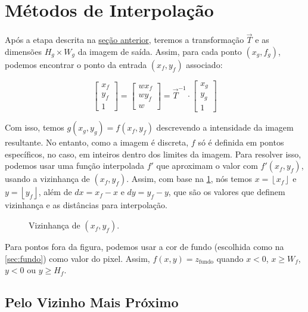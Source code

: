 \section{Métodos de Interpolação} \label{sec:interp}

Após a etapa descrita na \hyperref[sec:transformacoes]{seção anterior}, teremos a transformação $\vec{T}$ e as dimensões $H_g \times W_g$ da imagem de saída. Assim, para cada ponto $(x_g, f_g)$, podemos encontrar o ponto da entrada $(x_f, y_f)$ associado:

\[
    \begin{bmatrix}
        x_f \\
        y_f \\
        1
    \end{bmatrix}
    = \begin{bmatrix}
        w x_f \\
        w y_f \\
        w
    \end{bmatrix}
    = \vec{T}^{-1} \cdot \begin{bmatrix}
        x_g \\
        y_g \\
        1
    \end{bmatrix}
\]

Com isso, temos $g(x_g, y_g) = f(x_f, y_f)$ descrevendo a intensidade da imagem resultante. No entanto, como a imagem é discreta, $f$ só é definida em pontos específicos, no caso, em inteiros dentro dos limites da imagem. Para resolver isso, podemos usar uma função interpolada $f'$ que aproximam o valor com $f'(x_f, y_f)$, usando a vizinhança de $(x_f, y_f)$. Assim, com base na \cref{fig:viz:exemplo}, nós temos $x = \left\lfloor x_f \right\rfloor$ e $y = \left\lfloor y_f \right\rfloor$, além de $dx = x_f - x$ e $dy = y_f - y$, que são os valores que definem vizinhança e as distâncias para interpolação.

\begin{figure}[H]
    \centering
    
    \caption{Vizinhança de $(x_f, y_f)$.}
    \label{fig:viz:exemplo}
\end{figure}

Para pontos fora da figura, podemos usar a cor de fundo (escolhida como na \cref{sec:fundo}) como valor do pixel. Assim, $f(x, y) = z_\text{fundo}$ quando $x < 0$, $x \geq W_f$, $y < 0$ ou $y \geq H_f$.

\subsection{Pelo Vizinho Mais Próximo} \label{sec:interp:vizinho}

